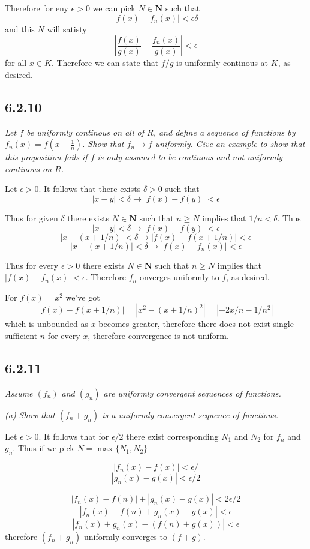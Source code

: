 \documentclass[11pt,oneside,titlepage]{book}
\begin{document}
Therefore for eny $\epsilon > 0$ we can pick $N \in \textbf{N}$ such that
$$|f(x) - f_n(x)|  < \epsilon \delta$$
and this $N$ will satisty
$$\left|\frac{f(x)}{g(x)} - \frac{f_n(x)}{g(x)}\right|  < \epsilon$$
for all $x \in K$. 
Therefore we can state that $f/g$ is uniformly continous at $K$, as desired.

\subsection*{6.2.10}
\textit{Let $f$ be uniformly continous on all of $R$, and define a sequence
  of functions by $f_n(x) = f(x + \frac 1 n)$. Show that $f_n \to f$ uniformly.
  Give an example to show that this proposition fails if $f$ is only assumed to
  be continous and not uniformly continous on $R$.}

Let $\epsilon > 0$. It follows that there exists $\delta > 0$ such that
$$|x - y| < \delta \to |f(x) - f(y)| < \epsilon$$

Thus for given $\delta$ there exists $N \in \textbf{N}$ such that
$n \geq N$ implies that $1/n < \delta$. Thus
$$|x - y| < \delta \to |f(x) - f(y)| < \epsilon$$
$$|x - (x + 1/n)| < \delta \to |f(x) - f(x + 1/n)| < \epsilon$$
$$|x - (x + 1/n)| < \delta \to |f(x) - f_n(x)| < \epsilon$$

Thus for every $\epsilon > 0$ there exists $N \in \textbf{N}$ such that
$n \geq N$ implies that $|f(x) - f_n(x)| < \epsilon$. Therefore
$f_n$ onverges uniformly to $f$, as desired.

For $f(x) = x^2$ we've got
$$|f(x) - f(x + 1/n)| = |x^2 - (x + 1/n)^2| = |-2x/n - 1/n^2|$$
which is unbounded as $x$ becomes greater, therefore there does not
exist single sufficient $n$ for every $x$, therefore convergence is
not uniform.

\subsection*{6.2.11}
\textit{Assume $(f_n)$ and $(g_n)$ are uniformly convergent sequences of
  functions.}

\textit{(a) Show that $(f_n + g_n)$ is a uniformly convergent sequence of
  functions.}

Let $\epsilon > 0$. It follows that for $\epsilon/2$
there exist corresponding $N_1$ and $N_2$ for $f_n$ and $g_n$. Thus
if we pick $N = \max\{N_1, N_2\}$

$$|f_n(x) - f(x)| < \epsilon/$$
$$|g_n(x) - g(x)| < \epsilon/2$$

$$|f_n(x) - f(n)| + |g_n(x) - g(x)| < 2\epsilon/2$$
$$|f_n(x) - f(n) + g_n(x) - g(x)| < \epsilon$$
$$|f_n(x) + g_n(x) - (f(n)  + g(x))| < \epsilon$$
therefore $(f_n + g_n)$ uniformly converges to $(f + g)$.
\end{document}
